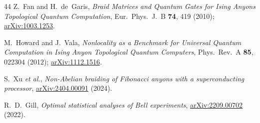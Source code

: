 \documentclass[aps,pra,twocolumn,superscriptaddress,longbibliography,floatfix,nofootinbib]{revtex4-2}
\begin{document}
\begin{thebibliography}{44}
Z.~Fan and H.~de~Garis,
\textit{Braid Matrices and Quantum Gates for Ising Anyons Topological Quantum Computation},
Eur.\ Phys.\ J.\ B \textbf{74}, 419 (2010);
\href{https://arxiv.org/abs/1003.1253}{arXiv:1003.1253}.

M.~Howard and J.~Vala,
\textit{Nonlocality as a Benchmark for Universal Quantum Computation in Ising Anyon Topological Quantum Computers},
Phys.\ Rev.\ A \textbf{85}, 022304 (2012);
\href{https://arxiv.org/abs/1112.1516}{arXiv:1112.1516}.

S.~Xu \emph{et al.},
\textit{Non-Abelian braiding of Fibonacci anyons with a superconducting processor},
\href{https://arxiv.org/abs/2404.00091}{arXiv:2404.00091} (2024).

R.~D.~Gill,
\textit{Optimal statistical analyses of Bell experiments},
\href{https://arxiv.org/abs/2209.00702}{arXiv:2209.00702} (2022).

\end{thebibliography}
\end{document}
